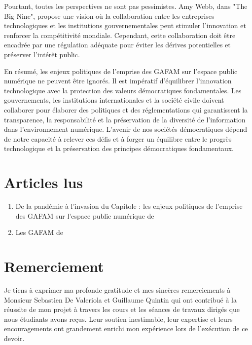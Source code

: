 \documentclass[12pt,a4paper]{article} %
\begin{document}
    Pourtant, toutes les perspectives ne sont pas pessimistes. Amy Webb, dans "The Big Nine", propose une vision où la collaboration entre les entreprises technologiques et les institutions gouvernementales peut stimuler l'innovation et renforcer la compétitivité mondiale. Cependant, cette collaboration doit être encadrée par une régulation adéquate pour éviter les dérives potentielles et préserver l'intérêt public. 
    
    En résumé, les enjeux politiques de l'emprise des GAFAM sur l'espace public numérique ne peuvent être ignorés. Il est impératif d'équilibrer l'innovation technologique avec la protection des valeurs démocratiques fondamentales. Les gouvernements, les institutions internationales et la société civile doivent collaborer pour élaborer des politiques et des réglementations qui garantissent la transparence, la responsabilité et la préservation de la diversité de l'information dans l'environnement numérique. L'avenir de nos sociétés démocratiques dépend de notre capacité à relever ces défis et à forger un équilibre entre le progrès technologique et la préservation des principes démocratiques fondamentaux.
    
    	\section{Articles lus}
    \begin{enumerate}
    	\item De la pandémie à l’invasion du Capitole : les enjeux politiques de l’emprise des GAFAM sur l’espace public numérique de \cite{Smyrnaios2021}
    	\item Les GAFAM de \cite{SushchevaNatalia2018}
    \end{enumerate}
    
    \section{Remerciement}
    Je tiens à exprimer ma profonde gratitude et mes sincères remerciements à Monsieur Sebastien De Valeriola et Guillaume Quintin qui ont contribué à la réussite de mon projet à travers les cours et les séances de travaux dirigés que nous étudiants avons reçus. Leur soutien inestimable, leur expertise et leurs encouragements ont grandement enrichi mon expérience lors de l'exécution de ce devoir.
    
	\printbibliography
\end{document}
